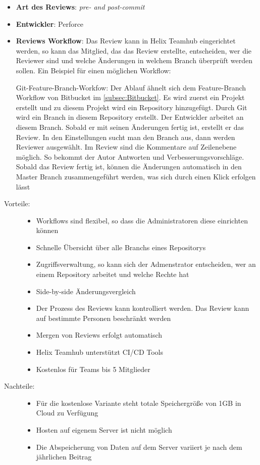 \begin{itemize}
	\item \textbf{Art des Reviews}: \textit{pre- and post-commit}
	\item \textbf{Entwickler}: Perforce
	\item \textbf{Reviews Workflow}: Das Review kann in Helix Teamhub eingerichtet werden, so kann das Mitglied, das das Review erstellte, entscheiden, wer die Reviewer
		 sind und welche Änderungen in welchem Branch überprüft werden sollen.
		 Ein Beispiel für einen möglichen Workflow:
		 
		  Git-Feature-Branch-Workfow: Der Ablauf ähnelt sich dem Feature-Branch Workflow von Bitbucket im \cref{subsec:Bitbucket}.
		  Es wird zuerst ein Projekt erstellt und zu diesem Projekt wird ein Repository hinzugefügt. Durch Git wird ein Branch in diesem Repository
		  erstellt. Der Entwickler arbeitet an diesem Branch. Sobald er mit seinen Änderungen fertig ist, erstellt er das Review. In den Einstellungen sucht man den Branch aus, dann werden Reviewer
		  ausgewählt. Im Review sind die Kommentare auf Zeilenebene möglich. So bekommt der Autor Antworten und Verbesserungsvorschläge. Sobald das Review fertig ist,
		  können die Änderungen automatisch in den Master Branch zusammengeführt werden, was sich durch einen Klick erfolgen lässt
\end{itemize}

\begin{description}
	\item [Vorteile:] \hfill
	\begin{itemize}
		\item Workflows sind flexibel, so dass die Administratoren diese einrichten können
		\item Schnelle Übersicht über alle Branchs eines Repositorys
		\item Zugriffsverwaltung, so kann sich der Admenstrator entscheiden, wer an einem Repository arbeitet und welche Rechte hat
		\item Side-by-side Änderungsvergleich
		\item Der Prozess des Reviews kann kontrolliert werden. Das Review kann auf bestimmte Personen beschränkt werden
		\item Mergen von Reviews erfolgt automatisch
		\item Helix Teamhub unterstützt \ac{CI}/\ac{CD} Tools
		\item Kostenlos für Teams bis 5 Mitglieder
	\end{itemize}
	
	\item [Nachteile:] \hfill
	\begin{itemize}
	\item Für die kostenlose Variante steht totale Speichergröße von 1GB in Cloud zu Verfügung
	\item Hosten auf eigenem Server ist nicht möglich
	\item Die Abspeicherung von Daten auf dem Server variiert je nach dem jährlichen Beitrag
	\end{itemize}
\end{description}


